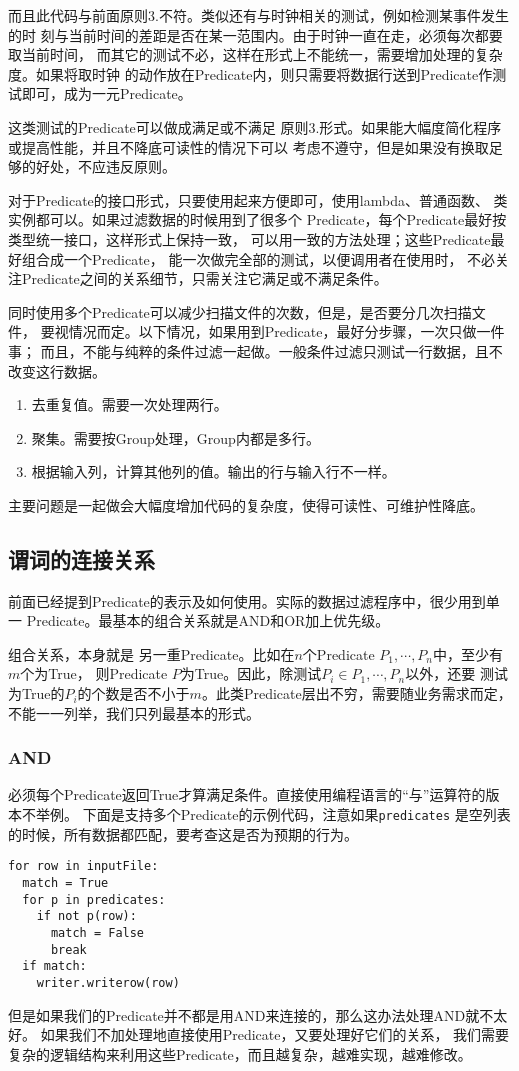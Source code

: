 \documentclass[11pt]{article}
\newcommand{\id}[1]{\texttt{#1}}
\begin{document}
而且此代码与前面原则3.不符。类似还有与时钟相关的测试，例如检测某事件发生的时
刻与当前时间的差距是否在某一范围内。由于时钟一直在走，必须每次都要取当前时间，
而其它的测试不必，这样在形式上不能统一，需要增加处理的复杂度。如果将取时钟
的动作放在Predicate内，则只需要将数据行送到Predicate作测试即可，成为一元Predicate。

这类测试的Predicate可以做成满足或不满足
原则3.形式。如果能大幅度简化程序或提高性能，并且不降底可读性的情况下可以
考虑不遵守，但是如果没有换取足够的好处，不应违反原则。

对于Predicate的接口形式，只要使用起来方便即可，使用lambda、普通函数、
类实例都可以。如果过滤数据的时候用到了很多个
Predicate，每个Predicate最好按类型统一接口，这样形式上保持一致，
可以用一致的方法处理；这些Predicate最好组合成一个Predicate，
能一次做完全部的测试，以便调用者在使用时，
不必关注Predicate之间的关系细节，只需关注它满足或不满足条件。

同时使用多个Predicate可以减少扫描文件的次数，但是，是否要分几次扫描文件，
要视情况而定。以下情况，如果用到Predicate，最好分步骤，一次只做一件事；
而且，不能与纯粹的条件过滤一起做。一般条件过滤只测试一行数据，且不改变这行数据。

\begin{enumerate}
  \item 去重复值。需要一次处理两行。
  \item 聚集。需要按Group处理，Group内都是多行。
  \item 根据输入列，计算其他列的值。输出的行与输入行不一样。
\end{enumerate}

主要问题是一起做会大幅度增加代码的复杂度，使得可读性、可维护性降底。


\subsection{谓词的连接关系}
前面已经提到Predicate的表示及如何使用。实际的数据过滤程序中，很少用到单一
Predicate。最基本的组合关系就是AND和OR加上优先级。

组合关系，本身就是
另一重Predicate。比如在$n$个Predicate $P_1, \cdots, P_n$中，至少有$m$个为True，
则Predicate $P$为True。因此，除测试$P_i \in {P_1, \cdots, P_n}$以外，还要
测试为True的$P_i$的个数是否不小于$m$。此类Predicate层出不穷，需要随业务需求而定，
不能一一列举，我们只列最基本的形式。

\subsubsection{AND}
必须每个Predicate返回True才算满足条件。直接使用编程语言的“与”运算符的版本不举例。
下面是支持多个Predicate的示例代码，注意如果\id{predicates}
是空列表的时候，所有数据都匹配，要考查这是否为预期的行为。
\begin{lstlisting}
for row in inputFile:
  match = True
  for p in predicates:
    if not p(row):
      match = False
      break
  if match:
    writer.writerow(row)
\end{lstlisting}
但是如果我们的Predicate并不都是用AND来连接的，那么这办法处理AND就不太好。
如果我们不加处理地直接使用Predicate，又要处理好它们的关系，
我们需要复杂的逻辑结构来利用这些Predicate，而且越复杂，越难实现，越难修改。
\end{document}
